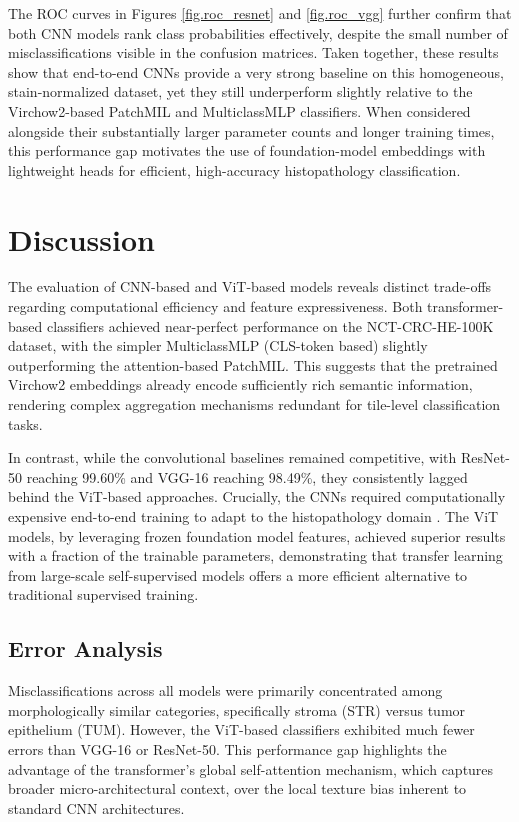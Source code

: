 \documentclass[a4paper,12pt]{article}
\begin{document}
The ROC curves in Figures \ref{fig.roc_resnet} and \ref{fig.roc_vgg} further confirm that both CNN models rank class probabilities effectively, despite the small number of misclassifications visible in the confusion matrices. Taken together, these results show that end-to-end CNNs provide a very strong baseline on this homogeneous, stain-normalized dataset, yet they still underperform slightly relative to the Virchow2-based PatchMIL and MulticlassMLP classifiers. When considered alongside their substantially larger parameter counts and longer training times, this performance gap motivates the use of foundation-model embeddings with lightweight heads for efficient, high-accuracy histopathology classification.


\section{Discussion}
The evaluation of CNN-based and ViT-based models reveals distinct trade-offs regarding computational efficiency and feature expressiveness. Both transformer-based classifiers achieved near-perfect performance on the NCT-CRC-HE-100K dataset, with the simpler MulticlassMLP (CLS-token based) slightly outperforming the attention-based PatchMIL. This suggests that the pretrained Virchow2 embeddings already encode sufficiently rich semantic information, rendering complex aggregation mechanisms redundant for tile-level classification tasks.

In contrast, while the convolutional baselines remained competitive, with ResNet-50 reaching 99.60\% and VGG-16 reaching 98.49\%, they consistently lagged behind the ViT-based approaches. Crucially, the CNNs required computationally expensive end-to-end training to adapt to the histopathology domain \cite{kather_predicting_2019}. The ViT models, by leveraging frozen foundation model features, achieved superior results with a fraction of the trainable parameters, demonstrating that transfer learning from large-scale self-supervised models offers a more efficient alternative to traditional supervised training.

\subsection{Error Analysis}
Misclassifications across all models were primarily concentrated among morphologically similar categories, specifically stroma (STR) versus tumor epithelium (TUM). However, the ViT-based classifiers exhibited much fewer errors than VGG-16 or ResNet-50. This performance gap highlights the advantage of the transformer's global self-attention mechanism, which captures broader micro-architectural context, over the local texture bias inherent to standard CNN architectures.
\end{document}
